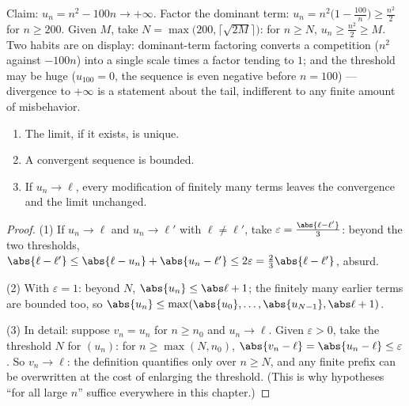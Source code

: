 \begin{example}\label{ex:b1:seq:toinfinity}
Claim: $u_n = n^2 - 100n \to +\infty$. Factor the dominant term:
$u_n = n^2\bigl(1 - \frac{100}{n}\bigr) \geq \frac{n^2}{2}$ for
$n \geq 200$. Given $M$, take $N = \max\bigl(200,
\lceil\sqrt{2M}\rceil\bigr)$: for $n \geq N$, $u_n \geq
\frac{n^2}{2} \geq M$. Two habits are on display: dominant-term
factoring converts a competition ($n^2$ against $-100n$) into a
single scale times a factor tending to $1$; and the threshold
may be huge ($u_{100} = 0$, the sequence is even negative before
$n = 100$) --- divergence to $+\infty$ is a statement about the
tail, indifferent to any finite amount of misbehavior.
\end{example}

\begin{proposition}\label{prop:b1:seq:first}
\begin{enumerate}
  \item The limit, if it exists, is unique.
  \item A convergent sequence is bounded.
  \item If $u_n \to \ell$, every modification of finitely many terms
        leaves the convergence and the limit unchanged.
\end{enumerate}
\end{proposition}

\begin{proof}
(1) If $u_n \to \ell$ and $u_n \to \ell'$ with $\ell \neq \ell'$,
take $\varepsilon = \frac{\abs{\ell - \ell'}}{3}$: beyond the two
thresholds, $\abs{\ell - \ell'} \leq \abs{\ell - u_n} + \abs{u_n -
\ell'} \leq 2\varepsilon = \frac23 \abs{\ell - \ell'}$, absurd.

(2) With $\varepsilon = 1$: beyond $N$, $\abs{u_n} \leq \abs\ell +
1$; the finitely many earlier terms are bounded too, so $\abs{u_n}
\leq \max(\abs{u_0}, \dots, \abs{u_{N-1}}, \abs\ell + 1)$.

(3) In detail: suppose $v_n = u_n$ for $n \geq n_0$ and $u_n \to
\ell$. Given $\varepsilon > 0$, take the threshold $N$ for
$(u_n)$: for $n \geq \max(N, n_0)$, $\abs{v_n - \ell} = \abs{u_n
- \ell} \leq \varepsilon$. So $v_n \to \ell$: the definition
quantifies only over $n \geq N$, and any finite prefix can be
overwritten at the cost of enlarging the threshold. (This is why
hypotheses ``for all large $n$'' suffice everywhere in this
chapter.)
\end{proof}

